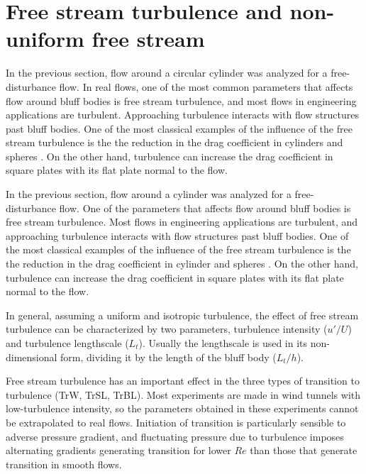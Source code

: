 \documentclass[journal]{new-aiaa}
\begin{document}
\clearpage
\section{Free stream turbulence and non-uniform free stream}


In the previous section, flow around a circular cylinder was analyzed for a free-disturbance flow. In real flows, one of the most common parameters that affects flow around bluff bodies is free stream turbulence, and most flows in engineering applications are turbulent. Approaching turbulence interacts with flow structures past bluff bodies. One of the most classical examples of the influence of the free stream turbulence is the the reduction in the drag coefficient in cylinders and spheres \cite{Nakamura1988}. On the other hand, turbulence can increase the drag coefficient in square plates with its flat plate normal to the flow. 

In the previous section, flow around a cylinder was analyzed for a free-disturbance flow. One of the parameters that affects flow around bluff bodies is free stream turbulence. Most flows in engineering applications are turbulent, and approaching turbulence interacts with flow structures past bluff bodies. One of the most classical examples of the influence of the free stream turbulence is the the reduction in the drag coefficient in cylinder and spheres \cite{Nakamura1988}. On the other hand, turbulence can increase the drag coefficient in square plates with its flat plate normal to the flow.


In general, assuming a uniform and isotropic turbulence, the effect of free stream turbulence can be characterized by two parameters, turbulence intensity ($u'/U$) and turbulence lengthscale ($L_t$). Usually the lengthscale is used in its non-dimensional form, dividing it by the length of the bluff body ($L_t/h$).


Free stream turbulence has an important effect in the three types of transition to turbulence (TrW, TrSL, TrBL). Most experiments are made in wind tunnels with low-turbulence intensity, so the parameters obtained in these experiments cannot be extrapolated to real flows. Initiation of transition is particularly sensible to adverse pressure gradient, and fluctuating pressure due to turbulence imposes alternating gradients generating transition for lower $Re$ than those that generate transition in smooth flows.  
\end{document}
